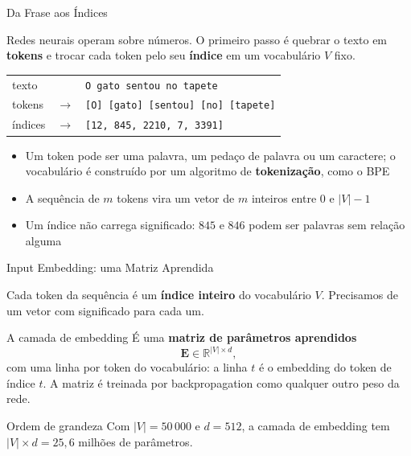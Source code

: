 \documentclass[aspectratio=169,xcolor=dvipsnames]{beamer}
\begin{document}
\begin{frame}{Da Frase aos Índices}

Redes neurais operam sobre números. O primeiro passo é quebrar o texto em \textbf{tokens} e trocar cada token pelo seu \textbf{índice} em um vocabulário $V$ fixo.

\vspace{8pt}

\begin{center}
\renewcommand{\arraystretch}{1.4}
\begin{tabular}{lcl}
texto & & \texttt{O gato sentou no tapete} \\
tokens & $\rightarrow$ & \texttt{[O] [gato] [sentou] [no] [tapete]} \\
índices & $\rightarrow$ & \texttt{[12, 845, 2210, 7, 3391]} \\
\end{tabular}
\end{center}

\vspace{8pt}

\begin{itemize}
    \item Um token pode ser uma palavra, um pedaço de palavra ou um caractere; o vocabulário é construído por um algoritmo de \textbf{tokenização}, como o BPE
    \item A sequência de $m$ tokens vira um vetor de $m$ inteiros entre $0$ e $|V|-1$
    \item Um índice não carrega significado: $845$ e $846$ podem ser palavras sem relação alguma
\end{itemize}

\end{frame}


\begin{frame}{Input Embedding: uma Matriz Aprendida}

Cada token da sequência é um \textbf{índice inteiro} do vocabulário $V$. Precisamos de um vetor com significado para cada um.

\vspace{6pt}

\begin{block}{A camada de embedding}
É uma \textbf{matriz de parâmetros aprendidos}
\[
\mathbf{E} \in \mathbb{R}^{|V| \times d},
\]
com uma linha por token do vocabulário: a linha $t$ é o embedding do token de índice $t$. A matriz é treinada por backpropagation como qualquer outro peso da rede.
\end{block}

\vspace{6pt}

\begin{exampleblock}{Ordem de grandeza}
Com $|V| = 50\,000$ e $d = 512$, a camada de embedding tem $|V| \times d = 25{,}6$ milhões de parâmetros.
\end{exampleblock}

\end{frame}
\end{document}
